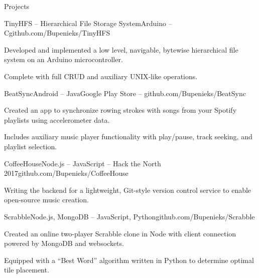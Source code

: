 \documentclass{resume} %
\begin{document}
\begin{rSection}{Projects}





\begin{rSubsection}{TinyHFS -- Hierarchical File Storage System}{}{Arduino -- C}{github.com/Bupenieks/TinyHFS}

\item Developed and implemented a low level, navigable, bytewise hierarchical file system on an Arduino microcontroller.%
\item Complete with full CRUD and auxiliary UNIX-like operations.
\end{rSubsection}


\begin{rSubsection}{BeatSync}{}{Android -- Java}{Google Play Store -- github.com/Bupenieks/BeatSync}
\item Created an app to synchronize rowing strokes with songs from your Spotify playlists using accelerometer data.
\item Includes auxiliary music player functionality with play/pause, track seeking, and playlist selection. 
\end{rSubsection}


\begin{rSubsection}{CoffeeHouse}{}{Node.js -- JavaScript -- Hack the North 2017}{github.com/Bupenieks/CoffeeHouse}
\item Writing the backend for a lightweight, Git-style version control service to enable open-source music creation. 
\end{rSubsection}


\begin{rSubsection}{Scrabble}{}{Node.js, MongoDB -- JavaScript, Python}{github.com/Bupenieks/Scrabble}
\item  Created an online two-player Scrabble clone in Node with client connection powered by MongoDB and websockets. 
\item Equipped with a ``Best Word'' algorithm written in Python to determine optimal tile placement.
	\end{rSubsection}



\end{rSection}
\end{document}
